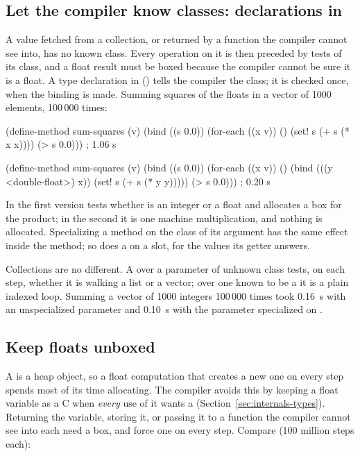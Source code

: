 \subsection{Let the compiler know classes: declarations in }

A value fetched from a collection, or returned by a function the
compiler cannot see into, has no known class. Every operation on it is
then preceded by tests of its class, and a float result must be boxed
because the compiler cannot be sure it is a float. A type declaration in
 () tells the compiler the class; it is
checked once, when the binding is made. Summing squares of the floats in
a vector of 1000 elements, 100\,000 times:

\begin{dylan}
(define-method sum-squares (v)
  (bind ((s 0.0))
    (for-each ((x v)) ()
      (set! s (+ s (* x x))))
    (> s 0.0)))                                   ; 1.06 s
\end{dylan}

\begin{dylan}
(define-method sum-squares (v)
  (bind ((s 0.0))
    (for-each ((x v)) ()
      (bind (((y <double-float>) x))
        (set! s (+ s (* y y)))))
    (> s 0.0)))                                   ; 0.20 s
\end{dylan}

In the first version  tests whether  is an integer
or a float and allocates a box for the product; in the second it is one
machine multiplication, and nothing is allocated. Specializing a method
on the class of its argument has the same effect inside the method; so
does a  on a slot, for the values its getter answers.

Collections are no different. A  over a parameter of
unknown class tests, on each step, whether it is walking a list or a
vector; over one known to be a  it is a
plain indexed loop. Summing a vector of 1000 integers 100\,000 times took
0.16~s with an unspecialized parameter and 0.10~s with the parameter
specialized on .

\subsection{Keep floats unboxed}

A  is a heap object, so a float computation that
creates a new one on every step spends most of its time allocating. The
compiler avoids this by keeping a float variable as a C 
when \emph{every} use of it wants a 
(Section~\ref{sec:internals-types}). Returning the variable, storing it,
or passing it to a function the compiler cannot see into each need a
box, and force one on every step. Compare (100 million steps each):

